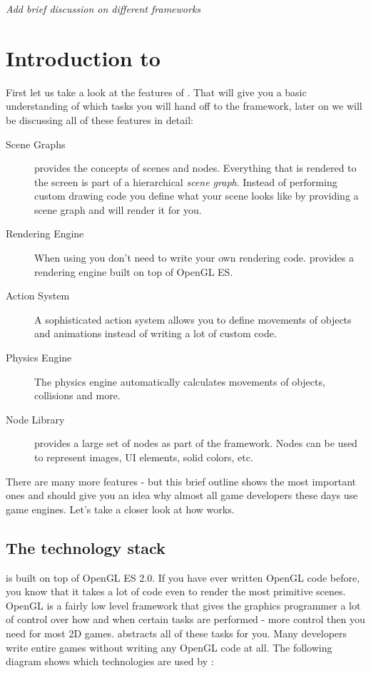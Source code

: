 \textit{Add brief discussion on different frameworks}

\section{Introduction to \cocos{}}
First let us take a look at the features of \cocos{}. That will give you a basic
understanding of which tasks you will hand off to the framework, later on we
will be discussing all of these features in detail:
\begin{description}
  \item[Scene Graphs] \cocos{} provides the concepts of scenes and nodes.
  Everything that is rendered to the screen is part of a hierarchical
  \textit{scene graph}. Instead of performing custom drawing code you define
  what your scene looks like by providing a scene graph and \cocos{} will render
  it for you.
  \item[Rendering Engine] When using \cocos{} you don't need to write your own
  rendering code. \cocos{} provides a rendering engine built on top of OpenGL
  ES.
  \item[Action System] A sophisticated action system allows you to define
  movements of objects and animations instead of writing a lot of custom code.
  \item[Physics Engine] The \cocos{} physics engine automatically
  calculates movements of objects, collisions and more.
  \item[Node Library] \cocos{} provides a large set of nodes as part of the
  framework. Nodes can be used to represent images, UI elements, solid colors,
  etc.
\end{description}

There are many more features - but this brief outline shows the most
important ones and should give you an idea why almost all game developers these
days use game engines.  Let's take a closer look at how \cocos{} works.

\subsection{The \cocos{} technology stack}

\cocos{} is built on top of OpenGL ES 2.0. If you have ever written OpenGL code
before, you know that it takes a lot of code even to render the most primitive
scenes.	OpenGL is a fairly low level framework that gives the graphics
programmer a lot of control over how and when certain tasks are performed -
more control then you need for most 2D games. \cocos{} abstracts all of these
tasks for you. Many \cocos{} developers write entire games without writing any
OpenGL code at all. The following diagram shows which technologies are used by
\cocos{}:

